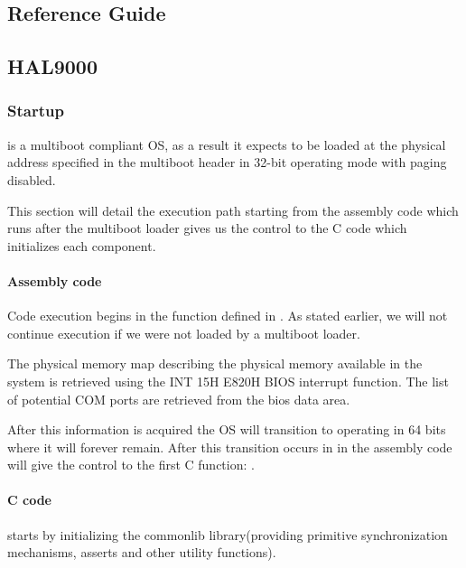 \begin{appendices}

\chapter{Reference Guide}

\section{HAL9000}

\subsection{Startup}
\label{sect:OsStart}

\projectname is a multiboot compliant OS, as a result it expects to be loaded at the physical
address specified in the multiboot header in 32-bit operating mode with paging disabled.

This section will detail the execution path starting from the assembly code which runs after the
multiboot loader gives us the control to the C code which initializes each component.

\subsubsection{Assembly code}

Code execution begins in the  function defined in . As
stated earlier, we will not continue execution if we were not loaded by a multiboot loader.

The physical memory map describing the physical memory available in the system is retrieved using
the INT 15H E820H BIOS interrupt function. The list of potential COM ports are retrieved from the
bios data area.

After this information is acquired the OS will transition to operating in 64 bits where it will
forever remain. After this transition occurs in  in 
the assembly code will give the control to the first C function: .

\subsubsection{C code}

 starts by initializing the commonlib library(providing primitive synchronization
 mechanisms, asserts and other utility functions).


\end{appendices}
